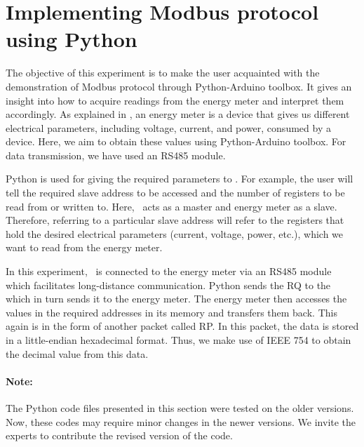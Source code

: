 
\section{Implementing Modbus protocol using Python}
The objective of this experiment is to make the user acquainted with
the demonstration of Modbus protocol through Python-Arduino toolbox. 
It gives an insight into how to acquire readings from the energy meter and interpret them accordingly. As explained in , 
an energy meter is a device that gives us different electrical parameters, including voltage, current, and power, consumed by a device. Here, we aim to obtain these values using Python-Arduino toolbox. For data transmission, we have used an RS485 module.

Python is used for giving the required parameters to \arduino. For
example, the user will tell the required slave address to be accessed
and the number of registers to be read from or written to. Here,
\arduino\ acts as a master and energy meter as a slave. Therefore,
referring to a particular slave address will refer to the registers
that hold the desired electrical parameters (current, voltage, power, etc.), which we want to read from the energy meter.

In this experiment, \arduino\ is connected to the energy meter via an RS485 module which facilitates long-distance communication. 
Python sends the RQ to the \arduino\, which in turn sends it to the
energy meter. The energy meter then accesses the values in the
required addresses in its memory and transfers them back. This again
is in the form of another packet called RP. In this packet, the data is stored in a little-endian hexadecimal format. Thus, we make use of IEEE 754 to obtain the decimal value from this data. 

\paragraph{Note: } The Python code files presented in this section were tested on the older versions. Now, these codes may require minor changes in
the newer versions. We invite the experts to contribute the revised version of the code.



